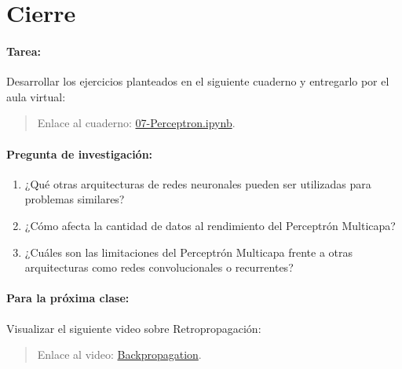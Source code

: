 \documentclass[a4,11pt]{aleph-notas}
\begin{document}
\section*{Cierre}

\paragraph{Tarea:}
    Desarrollar los ejercicios planteados en el siguiente cuaderno y entregarlo por el aula virtual:
    \begin{quote}
        Enlace al cuaderno: \href{https://colab.research.google.com/github/andres-merino/AprendizajeAutomaticoInicial-05-N0105/blob/main/2-Ejercicios/07-Perceptron.ipynb}{07-Perceptron.ipynb}.
    \end{quote}

\paragraph{Pregunta de investigación:}  
\begin{enumerate}[leftmargin=*]
    \item ¿Qué otras arquitecturas de redes neuronales pueden ser utilizadas para problemas similares?
    \item ¿Cómo afecta la cantidad de datos al rendimiento del Perceptrón Multicapa?
    \item ¿Cuáles son las limitaciones del Perceptrón Multicapa frente a otras arquitecturas como redes convolucionales o recurrentes?
\end{enumerate}

\paragraph{Para la próxima clase:}  
Visualizar el siguiente video sobre Retropropagación:
    \begin{quote}
        Enlace al video: \href{https://youtu.be/eNIqz_noix8?si=RzQqVstBn3TFKDk7}{Backpropagation}.
    \end{quote}
\end{document}
